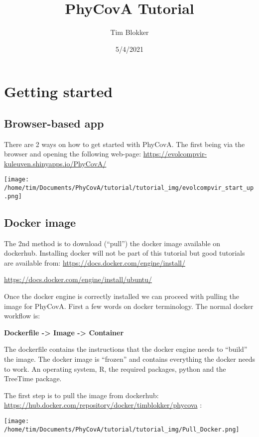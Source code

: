 \documentclass[
]{article}
\title{PhyCovA Tutorial}
\author{Tim Blokker}
\date{5/4/2021}
\begin{document}
\maketitle

{
\setcounter{tocdepth}{3}
\tableofcontents
}
\hypertarget{getting-started}{%
\section{Getting started}\label{getting-started}}

\hypertarget{browser-based-app}{%
\subsection{Browser-based app}\label{browser-based-app}}

There are 2 ways on how to get started with PhyCovA. The first being via
the browser and opening the following web-page:
\url{https://evolcompvir-kuleuven.shinyapps.io/PhyCovA/}

\texttt{[image: /home/tim/Documents/PhyCovA/tutorial/tutorial\_img/evolcompvir\_start\_up.png]}

\hypertarget{docker-image}{%
\subsection{Docker image}\label{docker-image}}

The 2nd method is to download (``pull'') the docker image available on
dockerhub. Installing docker will not be part of this tutorial but good
tutorials are available from:
\url{https://docs.docker.com/engine/install/}

\url{https://docs.docker.com/engine/install/ubuntu/}

Once the docker engine is correctly installed we can proceed with
pulling the image for PhyCovA. First a few words on docker terminology.
The normal docker workflow is:

\textbf{Dockerfile -\textgreater{} Image -\textgreater{} Container}

The dockerfile contains the instructions that the docker engine needs to
``build'' the image. The docker image is ``frozen'' and contains
everything the docker needs to work. An operating system, R, the
required packages, python and the TreeTime package.

The first step is to pull the image from dockerhub:
\url{https://hub.docker.com/repository/docker/timblokker/phycova} :

\texttt{[image: /home/tim/Documents/PhyCovA/tutorial/tutorial\_img/Pull\_Docker.png]}
\end{document}
